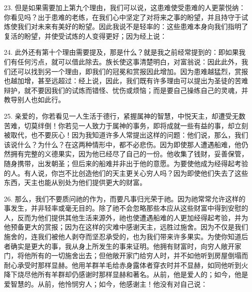23. 但是如果需要加上第九个理由，我们可以说，这患难使受患难的人更蒙悦纳：\newline{}你看见吗？出于患难的老练，在我们心中坚定了对将来之事的盼望，并且持守于试炼使我们对未来有美好的盼望。因此我说不是轻率的：这些患难本身向我们指明了复活的盼望，并使受试炼的人变得更好；因为经上说：\par

24. 此外还有第十个理由需要提及，那是什么？就是我之前经常提到的：即如果我们有任何污点，就可以借此除去。族长使这事清楚明白，对富翁说：\newline{}因此\newline{}此外，我们还可以找到另一个理由，即我们的冠冕和赏报因此增加。因为患难越猛烈，赏报也越加增，甚至远超过：经上说，\newline{}因此，我们既有许多理由可以提出为圣徒的苦难辩护，就不要因我们的试炼而错怪、忧伤或烦恼；而是要自己操练自己的灵魂，并教导别人也如此行。\par

25. 亲爱的，你若看见一人生活于德行，紧握属神的智慧，中悦天主，却遭受无数苦难，切莫绊倒！你若见一人致力于属神的事务，即将成就一些有益的事，却立刻被取代，也不要灰心！因为我知道许多人常提出这样的问题：他们说，那么，我们该说什么？为什么？在这两种情形中，都不必悲伤。因为即使那人遭遇船难，他仍然拥有完整的义德果实，因为他已经尽了自己的一份。他收集了钱财，妥善保管，随身携带，出发朝圣；但后来的船难并非出于他的意愿。为要使他成为经得起考验的人。有人说，你岂不比创造他们的天主更关心穷人吗？因为即使他们失去了这些东西，天主也能从别处为他们提供更大的财富。\par

26. 那么，我们不要质问祂的作为，而要凡事归光荣于祂。因为祂常常允许这样的事发生，并非轻率或毫无目的。除了祂不会忽略那些本应从这些财富中得到安慰的人，反而为他们提供其他生活来源外，祂也使遭遇船难的人更加经得起考验，并为他预备更大的赏报；因为在这样的灾难中感谢天主，远胜过施舍。因为不仅是我们施舍的，连我们被他人剥夺而坚忍承受的，也为我们带来许多果实。为使你知道后者确实是更大的事，我从身上所发生的事来证明。他拥有财富时，向穷人敞开家门，将他所有的一切施舍出去；但他敞开家门给穷人时，并不如他听到房屋倒塌而耐心承受时那样显赫。他用羊群羊毛给赤身露体者穿衣时并不显赫，如同他听到火降下烧尽他所有羊群却仍感谢时那样显赫和著名。从前，他是爱人的；如今，他是爱智慧的。从前，他怜悯穷人；如今，他感谢主！他没有对自己说：\par

